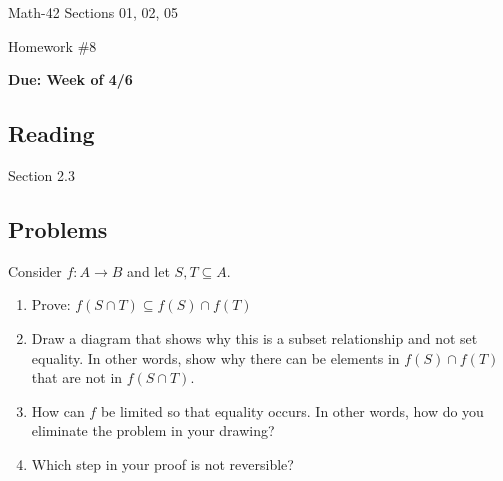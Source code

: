 \documentclass[letterpaper,12pt,fleqn]{article}
\begin{document}
\begin{center}
  \large
  Math-42 Sections 01, 02, 05

  \Large
  Homework \#8

  \large
  \textbf{Due: Week of 4/6}
\end{center}

\subsection*{Reading}

Section 2.3

\subsection*{Problems}

Consider \(f:A\to B\) and let \(S,T\subseteq A\).

\begin{enumerate}[left=0in]
\item Prove: \(f(S\cap T)\subseteq f(S)\cap f(T)\)
\item Draw a diagram that shows why this is a subset relationship and not set equality.  In other words, show why
  there can be elements in \(f(S)\cap f(T)\) that are not in \(f(S\cap T)\).
\item How can \(f\) be limited so that equality occurs.  In other words, how do you eliminate the problem in
  your drawing?
\item Which step in your proof is not reversible?
\end{enumerate}
\end{document}
